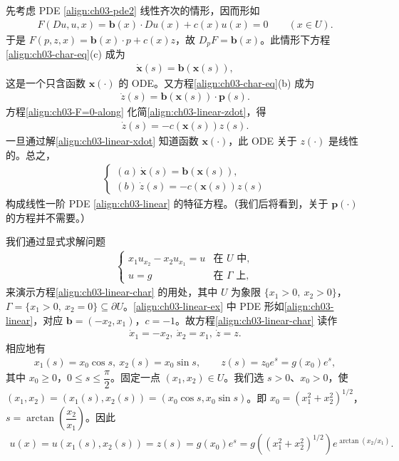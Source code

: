 \documentclass[../../main.tex]{subfiles}
\begin{document}
先考虑 PDE \eqref{align:ch03-pde2} 线性齐次的情形，因而形如
\begin{align}\label{align:ch03-linear}
F(Du,u,x)=\mathbf{b}(x)\cdot Du(x)+c(x)u(x)=0 \qquad (x\in U).
\end{align}
于是 $F(p,z,x)=\mathbf{b}(x)\cdot p+c(x)z$，故 $D_p F=\mathbf{b}(x)$。此情形下方程\eqref{align:ch03-char-eq}(c) 成为
\begin{align}\label{align:ch03-linear-xdot}
\dot{\mathbf{x}}(s)=\mathbf{b}(\mathbf{x}(s)),
\end{align}
这是一个只含函数 $\mathbf{x}(\cdot)$ 的 ODE。又方程\eqref{align:ch03-char-eq}(b) 成为
\begin{align}\label{align:ch03-linear-zdot}
\dot{z}(s)=\mathbf{b}(\mathbf{x}(s))\cdot\mathbf{p}(s).
\end{align}
方程\eqref{align:ch03-F=0-along} 化简\eqref{align:ch03-linear-zdot}，得
\begin{align}\label{align:ch03-linear-z}
\dot{z}(s)=-c(\mathbf{x}(s))z(s).
\end{align}
一旦通过解\eqref{align:ch03-linear-xdot} 知道函数 $\mathbf{x}(\cdot)$，此 ODE 关于 $z(\cdot)$ 是线性的。总之，
\begin{align}\label{align:ch03-linear-char}
\begin{cases}
(a)\ \dot{\mathbf{x}}(s)=\mathbf{b}(\mathbf{x}(s)),\\
(b)\ \dot{z}(s)=-c(\mathbf{x}(s))z(s)
\end{cases}
\end{align}
构成线性一阶 PDE \eqref{align:ch03-linear} 的特征方程。（我们后将看到，关于 $\mathbf{p}(\cdot)$ 的方程并不需要。）

\begin{example}\label{example:ch03-linear}
我们通过显式求解问题
\begin{align}\label{align:ch03-linear-ex}
\begin{cases}
x_1 u_{x_2}-x_2 u_{x_1}=u & \text{在 }U\text{ 中},\\
u=g & \text{在 }\Gamma\text{ 上},
\end{cases}
\end{align}
来演示方程\eqref{align:ch03-linear-char} 的用处，其中 $U$ 为象限 $\{x_1>0,\ x_2>0\}$，$\Gamma=\{x_1>0,\ x_2=0\}\subseteq\partial U$。\eqref{align:ch03-linear-ex} 中 PDE 形如\eqref{align:ch03-linear}，对应 $\mathbf{b}=(-x_2,x_1)$，$c=-1$。故方程\eqref{align:ch03-linear-char} 读作
\begin{align*}
\dot{x}_1=-x_2,\ \dot{x}_2=x_1,\ \dot{z}=z.
\end{align*}
相应地有
\begin{align*}
x_1(s)=x_0\cos s,\ x_2(s)=x_0\sin s,\qquad z(s)=z_0 e^s=g(x_0)e^s,
\end{align*}
其中 $x_0\geqslant 0$，$0\leqslant s\leqslant\dfrac{\pi}{2}$。固定一点 $(x_1,x_2)\in U$。我们选 $s>0$、$x_0>0$，使 $(x_1,x_2)=(x_1(s),x_2(s))=(x_0\cos s,x_0\sin s)$。即 $x_0=(x_1^2+x_2^2)^{1/2}$，$s=\arctan\!\left(\dfrac{x_2}{x_1}\right)$。因此
\begin{align*}
u(x)=u(x_1(s),x_2(s))=z(s)=g(x_0)e^s=g((x_1^2+x_2^2)^{1/2})e^{\arctan(x_2/x_1)}.
\end{align*}
\end{example}
\end{document}
